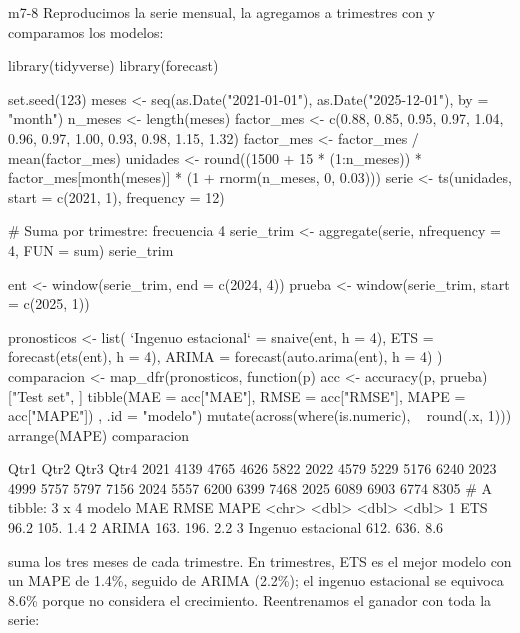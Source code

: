 \begin{solucion}{m7-8}
Reproducimos la serie mensual, la agregamos a trimestres con
 y comparamos los modelos:

\begin{rcode}
library(tidyverse)
library(forecast)

set.seed(123)
meses <- seq(as.Date("2021-01-01"), as.Date("2025-12-01"), by = "month")
n_meses <- length(meses)
factor_mes <- c(0.88, 0.85, 0.95, 0.97, 1.04, 0.96,
                0.97, 1.00, 0.93, 0.98, 1.15, 1.32)
factor_mes <- factor_mes / mean(factor_mes)
unidades <- round((1500 + 15 * (1:n_meses)) * factor_mes[month(meses)] *
                    (1 + rnorm(n_meses, 0, 0.03)))
serie <- ts(unidades, start = c(2021, 1), frequency = 12)

# Suma por trimestre: frecuencia 4
serie_trim <- aggregate(serie, nfrequency = 4, FUN = sum)
serie_trim

ent    <- window(serie_trim, end = c(2024, 4))
prueba <- window(serie_trim, start = c(2025, 1))

pronosticos <- list(
  `Ingenuo estacional` = snaive(ent, h = 4),
  ETS   = forecast(ets(ent), h = 4),
  ARIMA = forecast(auto.arima(ent), h = 4)
)
comparacion <- map_dfr(pronosticos, function(p) {
  acc <- accuracy(p, prueba)["Test set", ]
  tibble(MAE = acc["MAE"], RMSE = acc["RMSE"], MAPE = acc["MAPE"])
}, .id = "modelo") %
  mutate(across(where(is.numeric), ~ round(.x, 1))) %
  arrange(MAPE)
comparacion
\end{rcode}

\begin{rsalida}
     Qtr1 Qtr2 Qtr3 Qtr4
2021 4139 4765 4626 5822
2022 4579 5229 5176 6240
2023 4999 5757 5797 7156
2024 5557 6200 6399 7468
2025 6089 6903 6774 8305
# A tibble: 3 x 4
  modelo               MAE  RMSE  MAPE
  <chr>              <dbl> <dbl> <dbl>
1 ETS                 96.2  105.   1.4
2 ARIMA              163.   196.   2.2
3 Ingenuo estacional 612.   636.   8.6
\end{rsalida}

 suma los tres meses de
cada trimestre. En trimestres, ETS es el mejor modelo con un MAPE de 1.4\%,
seguido de ARIMA (2.2\%); el ingenuo estacional se equivoca 8.6\% porque no
considera el crecimiento. Reentrenamos el ganador con toda la serie:



\end{solucion}
